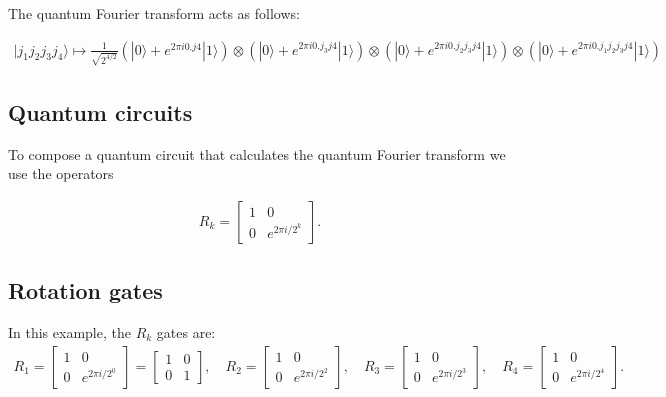 \documentclass[%
oneside,                 %
final,                   %
10pt]{article}
\begin{document}
The quantum Fourier transform acts as follows:

\begin{align*}
|j_1j_2j_3j_4 \rangle \mapsto \frac{1}{\sqrt{2^{4/2}}}
\left(|0\rangle + e^{2 \pi i 0.j4}|1\rangle \right) \otimes 
\left(|0\rangle + e^{2 \pi i 0.j_3j4}|1\rangle \right) \otimes 
\left(|0\rangle + e^{2 \pi i 0.j_2j_3j4}|1\rangle \right) \otimes 
\left(|0\rangle + e^{2 \pi i 0.j_1j_2j_3j4}|1\rangle \right) 
\end{align*}

\subsection{Quantum circuits}

To compose a quantum circuit that calculates the quantum Fourier
transform we use the operators

\begin{align*}
R_k = 
\begin{bmatrix}
1 & 0 \\
0 & e^{2\pi i/2^k}
\end{bmatrix}.
\end{align*}

\subsection{Rotation gates}

In this example, the \(R_k\) gates are:
\begin{align*}
R_1 = \begin{bmatrix}
1 & 0 \\
0 & e^{2 \pi i /2^0}
\end{bmatrix} = 
\begin{bmatrix}
1 & 0 \\
0 & 1
\end{bmatrix}, \quad 
R_2 = \begin{bmatrix}
1 & 0 \\
0 & e^{2 \pi i /2^2}
\end{bmatrix}, \quad 
R_3 = \begin{bmatrix}
1 & 0 \\
0 & e^{2 \pi i /2^3}
\end{bmatrix}, \quad 
R_4 = \begin{bmatrix}
1 & 0 \\
0 & e^{2 \pi i /2^4}
\end{bmatrix}.
\end{align*}
\end{document}
